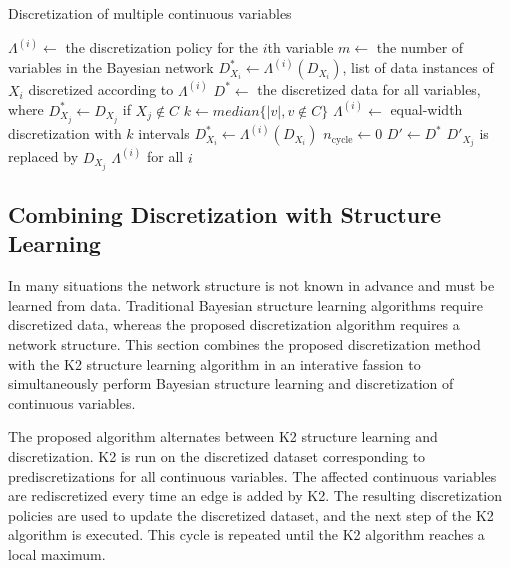 \begin{algorithm}
  \caption{Discretization of multiple continuous variables }
  \label{alg:disc_two}
  \begin{algorithmic}[5]
    \State $\Lambda^{(i)} \leftarrow$ the discretization policy for the $i$th variable
    \State $m \leftarrow$ the number of variables in the Bayesian network
    \State $D^*_{X_i} \leftarrow \Lambda^{(i)} (D_{X_i})$, list of data instances of ${X_i}$ discretized according to $\Lambda^{(i)}$
    \State $D^* \leftarrow $ the discretized data for all variables, where $D^*_{X_j} \leftarrow D_{X_j}$ if $X_j \notin C$
    \State $k \leftarrow median\{ |v|, v\notin C\}$
        \State $\Lambda^{(i)} \leftarrow$  equal-width discretization with $k$ intervals
        \State $D^*_{X_i} \leftarrow  \Lambda^{(i)} (D_{X_i})$
      \EndIf
    \EndFor
    \State
    \State $n_{\text{{cycle}}} \leftarrow 0$
        \State $D' \leftarrow D^*$
        \State $D'_{X_j}$ is replaced by $D_{X_j}$
      \EndFor
    \EndWhile
    \State \Return $\Lambda^{(i)}$ for all $i$
  \EndFunction
  \end{algorithmic}
\end{algorithm}

\subsection{Combining Discretization with Structure Learning}

In many situations the network structure is not known in advance and must be learned from data.
Traditional Bayesian structure learning algorithms require discretized data, whereas the proposed discretization algorithm requires a network structure.
This section combines the proposed discretization method with the K2 structure learning algorithm \citep{K2} in an interative fassion to simultaneously perform Bayesian structure learning and discretization of continuous variables.

The proposed algorithm alternates between K2 structure learning and discretization.
K2 is run on the discretized dataset corresponding to prediscretizations for all continuous variables.
The affected continuous variables are rediscretized every time an edge is added by K2.
The resulting discretization policies are used to update the discretized dataset, and the next step of the K2 algorithm is executed.
This cycle is repeated until the K2 algorithm reaches a local maximum.

